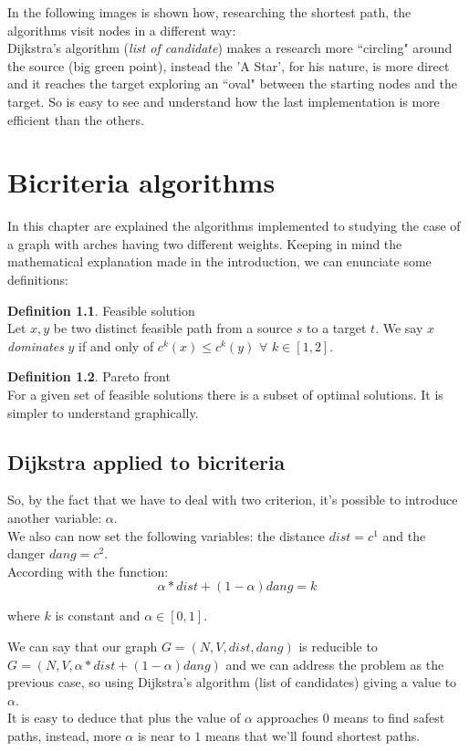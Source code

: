 \documentclass[a4paper,11pt]{report}
\begin{document}
In the following images is shown how, researching the shortest path, the algorithms visit nodes in a different way:\\
Dijkstra's algorithm (\textit{list of candidate}) makes a research more ``circling" around the source (big green point), instead the 'A Star', for his nature, is more direct and it reaches the target exploring an ``oval" between the starting nodes and the target. So is easy to see and understand how the last implementation is more efficient than the others.  

\chapter{Bicriteria algorithms}

In this chapter are explained the algorithms implemented to studying the case of a graph with arches having two different weights.
Keeping in mind the mathematical explanation made in the introduction, we can enunciate some definitions:

\theoremstyle{definition}
\newtheorem{definition}{Definition}
\begin{definition}{Feasible solution}\\
	Let $x, y$ be two distinct feasible path from a source $s$ to a target $t$. We say $x$ \emph{dominates} $y$ if and only of $c^k(x) \leq c^k(y)$ $\forall$ $k \in [1,2]$.
\end{definition}

\theoremstyle{definition}
\begin{definition}{Pareto front}\\
	For a given set of feasible solutions there is a subset of optimal solutions. It is simpler to understand graphically.
\end{definition}

\section{Dijkstra applied to bicriteria}
So, by the fact that we have to deal with two criterion, it's possible to introduce another variable: $\alpha$.\\
We also can now set the following variables: the distance $dist=c^1$ and the danger $dang=c^2$.\\
According with the function: 
\begin{equation}\label{eq:pareto front}
	\alpha*dist + (1-\alpha) dang = k
\end{equation}
\begin{center}
	where $k$ is constant and $\alpha \in [0, 1]$.
\end{center}
We can say that our graph $G=(N,V,dist,dang)$ is reducible to $G=(N,V,\alpha*dist + (1-\alpha) dang)$ and we can address the problem as the previous case, so using Dijkstra's algorithm (list of candidates) giving a value to $\alpha$.\\
It is easy to deduce that plus the value of $\alpha$ approaches $0$ means to find safest paths, instead, more $\alpha$ is near to $1$ means that we'll found shortest paths.
\end{document}
